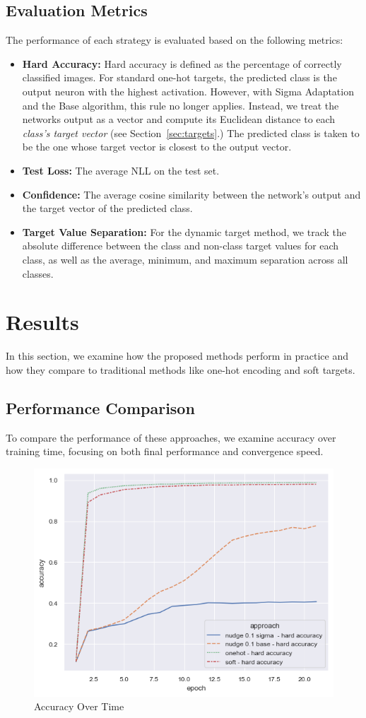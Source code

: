 \documentclass[12pt,fleqn,a4paper]{article}
\begin{document}
 \subsection{Evaluation Metrics}
 The performance of each strategy is evaluated based on the following metrics:
 \begin{itemize}
     \item \textbf{Hard Accuracy:} Hard accuracy is defined as the percentage of correctly classified images. For standard one-hot targets, the predicted class is the output neuron with the highest activation. However, with Sigma Adaptation and the Base algorithm, this rule no longer applies. Instead, we treat the networks output as a vector and compute its Euclidean distance to each \textit{class's target vector} (see Section~\ref{sec:targets}.) The predicted class is taken to be the one whose target vector is closest to the output vector.
     \item \textbf{Test Loss:} The average NLL on the test set.
     \item \textbf{Confidence:} The average cosine similarity between the network's output and the target vector of the predicted class.
     \item \textbf{Target Value Separation:} For the dynamic target method, we track the absolute difference between the class and non-class target values for each class, as well as the average, minimum, and maximum separation across all classes.
 \end{itemize}

\section{Results}
In this section, we examine how the proposed methods perform in practice and how they compare to traditional methods like one-hot encoding and soft targets.

\subsection{Performance Comparison}
To compare the performance of these approaches, we examine accuracy over training time, focusing on both final performance and convergence speed.
\begin{figure}[H]
    \centering
    \includegraphics[width=0.6\linewidth]{graphs/acc.png}
    \caption{Accuracy Over Time}
    \label{fig:acc}
\end{figure}
\end{document}
